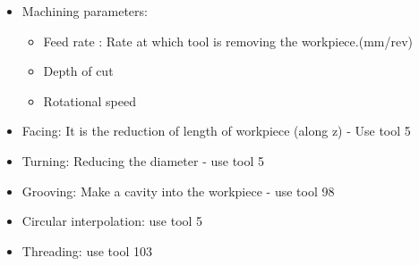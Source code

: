 \documentclass{article}
\begin{document}
\begin{itemize}

	\item Machining parameters:
	\begin{itemize}
	\item Feed rate : Rate at which tool is removing the workpiece.(mm/rev)
	\item Depth of cut
	\item Rotational speed
	\end{itemize}

	\item Facing: It is the reduction of length of workpiece (along z) - Use tool 5
	\item Turning: Reducing the diameter - use tool 5
	\item Grooving: Make a cavity into the workpiece - use tool 98
	\item Circular interpolation: use tool 5
	\item Threading: use tool 103











\end{itemize}
\end{document}
